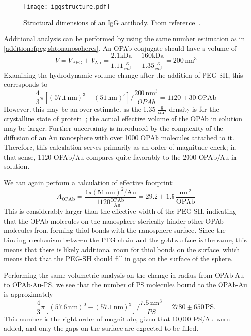 \begin{figure}[htbp]
\centering
\texttt{[image: iggstructure.pdf]}
\caption{Structural dimensions of an IgG antibody. From reference~\citep{antibodylength}.}
\label{iggstructure}
\end{figure}




Additional analysis can be performed by using the same number estimation as in \autoref{additionofpeg-shtonanospheres}. An OPAb conjugate should have a volume of
\[V=V_{\mathrm{PEG}}+V_{\mathrm{Ab}}=\frac{2.1\mathrm{kDa}}{1.11\frac{\mathrm g}{\mathrm cm^3}}+\frac{160\mathrm{kDa}}{1.35\frac{\mathrm g}{\mathrm cm^3}}=200\,\mathrm{nm}^3\]
Examining the hydrodynamic volume change after the addition of PEG-SH, this corresponds to
\[\frac{4}{3}\pi[(57.1\mathrm{\,nm})^3-(51\mathrm{\,nm})^3]/\frac{200\,\mathrm{nm}^3}{OPAb}=1120\pm30\mathrm{\ OPAb}\]
However, this may be an over-estimate, as the 1.35 $\mathrm{\frac{g}{cm^3}}$ density is for the crystalline state of protein~\citep{proteindensity}; the actual effective volume of the OPAb in solution may be larger. Further uncertainty is introduced by the complexity of the diffusion of an Au nanosphere with over 1000 OPAb molecules attached to it. Therefore, this calculation serves primarily as an order-of-magnitude check; in that sense, 1120 OPAb/Au compares quite favorably to the 2000 OPAb/Au in solution.

We can again perform a calculation of effective footprint: \[A_{\mathrm{OPAb}}=\frac{4\pi(51\mathrm{\,nm})^2/\mathrm{Au}}{1120\mathrm{\frac{OPAb}{Au}}}=29.2\pm1.6\,\frac{\mathrm{nm}^2}{\mathrm{OPAb}}\]
This is considerably larger than the effective width of the PEG-SH, indicating that the OPAb molecules on the nanosphere sterically hinder other OPAb molecules from forming thiol bonds with the nanosphere surface. Since the binding mechanism between the PEG chain and the gold surface is the same, this means that there is likely additional room for thiol bonds on the surface, which means that that the PEG-SH should fill in gaps on the surface of the sphere.

Performing the same volumetric analysis on the change in radius from OPAb-Au to OPAb-Au-PS, we see that the number of PS molecules bound to the OPAb-Au is approximately
\[\frac{4}{3}\pi[(57.6\mathrm{\,nm})^3-(57.1\mathrm{\,nm})^3]/\frac{7.5\,\mathrm{nm}^3}{PS}=2780\pm650\mathrm{\ PS}.\]
This number is the right order of magnitude, given that 10,000 PS\slash Au were added, and only the gaps on the surface are expected to be filled.

